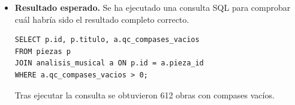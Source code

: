 \begin{itemize}
*   **Himno a Bolívar** (Autor: José Miguel Hernández Jaramillo)
*   **Me tuviste** (Autor: José Miguel Hernández Jaramillo)
*   **275556 Bog Road Slow** (Autor: )
*   **588** (Autor: )
*   **Campbells are Comin´** (Autor: )
*   **Catholic Boys** (Autor: )
*   **Charlie Mack** (Autor: )
*   **Doyle´s Frolic** (Autor: )
*   **Drum** (Autor: )
*   **Garry owen** (Autor: )"
    \item \textbf{Resultado esperado.} Se ha ejecutado una consulta SQL para comprobar cuál habría sido el resultado completo correcto.
    \begin{verbatim}
SELECT p.id, p.titulo, a.qc_compases_vacios
FROM piezas p
JOIN analisis_musical a ON p.id = a.pieza_id
WHERE a.qc_compases_vacios > 0;
    \end{verbatim}    
    Tras ejecutar la consulta se obtuvieron 612 obras con compases vacíos.

\end{itemize}

